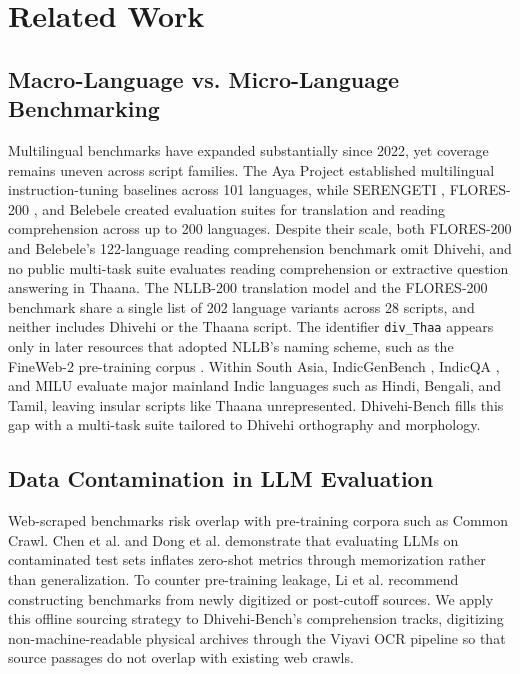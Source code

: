 \documentclass[acmsmall,review,anonymous]{acmart}
\begin{document}
\section{Related Work}

\subsection{Macro-Language vs. Micro-Language Benchmarking}
Multilingual benchmarks have expanded substantially since 2022, yet coverage remains uneven across script families. The Aya Project \cite{ustun_aya_2024} established multilingual instruction-tuning baselines across 101 languages, while SERENGETI \cite{adebara_serengeti_2023}, FLORES-200 \cite{team_no_2022}, and Belebele \cite{bandarkar_belebele_2024} created evaluation suites for translation and reading comprehension across up to 200 languages. Despite their scale, both FLORES-200 and Belebele's 122-language reading comprehension benchmark omit Dhivehi, and no public multi-task suite evaluates reading comprehension or extractive question answering in Thaana. The NLLB-200 translation model and the FLORES-200 benchmark share a single list of 202 language variants across 28 scripts, and neither includes Dhivehi or the Thaana script. The identifier \texttt{div\_Thaa} appears only in later resources that adopted NLLB's naming scheme, such as the FineWeb-2 pre-training corpus \cite{penedo_fineweb2_2025}. Within South Asia, IndicGenBench \cite{singh_indicgenbench_2024}, IndicQA \cite{singh_indic_2025}, and MILU \cite{verma_milu_2025} evaluate major mainland Indic languages such as Hindi, Bengali, and Tamil, leaving insular scripts like Thaana unrepresented. Dhivehi-Bench fills this gap with a multi-task suite tailored to Dhivehi orthography and morphology.

\subsection{Data Contamination in LLM Evaluation}
Web-scraped benchmarks risk overlap with pre-training corpora such as Common Crawl. Chen et al. \cite{chen_benchmarking_2025} and Dong et al. \cite{dong_generalization_2024} demonstrate that evaluating LLMs on contaminated test sets inflates zero-shot metrics through memorization rather than generalization. To counter pre-training leakage, Li et al. \cite{li_latesteval_2023} recommend constructing benchmarks from newly digitized or post-cutoff sources. We apply this offline sourcing strategy to Dhivehi-Bench's comprehension tracks, digitizing non-machine-readable physical archives through the Viyavi OCR pipeline \cite{hameed_bridging_2026} so that source passages do not overlap with existing web crawls.
\end{document}

